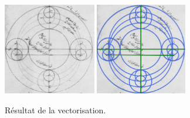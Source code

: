         
          \begin{figure}[H]
          \begin{center}
          \includegraphics[height=4cm]{figues/vecto_init.png}
          \includegraphics[height=4cm]{figues/vecto_results.png}
          \end{center}
          \caption{Résultat de la vectorisation.}
          \label{fig:results} \end{figure}

        


    